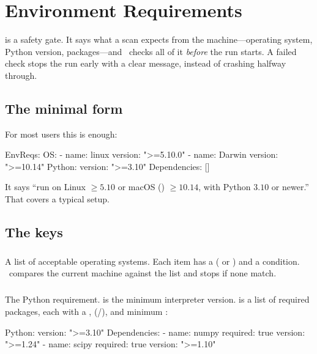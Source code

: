 \chapter{Environment Requirements}
\label{ch:envreqs}

 is a safety gate. It says what a scan expects from the
machine---operating system, Python version, packages---and \Jarvis\ checks all of it \emph{before}
the run starts. A failed check stops the run early with a clear message, instead of crashing
halfway through.

\section{The minimal form}
\label{sec:env-minimal}

For most users this is enough:

\begin{yamlwin}
EnvReqs:
  OS:
    - name: linux
      version: ">=5.10.0"
    - name: Darwin
      version: ">=10.14"
  Python:
    version: ">=3.10"
    Dependencies: []
\end{yamlwin}

\noindent It says ``run on Linux $\geq 5.10$ or macOS () $\geq 10.14$, with Python
$3.10$ or newer.'' That covers a typical setup.

\section{The keys}
\label{sec:env-keys}

\paragraph{} A list of acceptable operating systems. Each item has a 
( or ) and a  condition. \Jarvis\ compares the current
machine against the list and stops if none match.

\paragraph{} The Python requirement.  is the minimum interpreter
version.  is a list of required packages, each with a ,
 (/), and minimum :

\begin{yamlwin}
  Python:
    version: ">=3.10"
    Dependencies:
      - name: numpy
        required: true
        version: ">=1.24"
      - name: scipy
        required: true
        version: ">=1.10"
\end{yamlwin}

